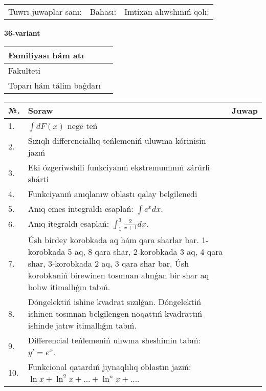 \documentclass{article}
\begin{document}
\vspace{1cm}

\begin{tabular}{ c c c }
Tuwrı juwaplar sanı: \underline{\hspace{2cm}} & Bahası: \underline{\hspace{2cm}} & Imtixan alıwshınıń qolı: \underline{\hspace{2cm}} \\
\end{tabular}

\newpage

\begin{center}\textbf{36-variant}\end{center}

\bgroup
\def\arraystretch{1.5}
\begin{tabular}{ |m{6cm}|m{10cm}| }
  \hline
  Familiyası hám atı & \\
  \hline
  Fakulteti &\\
  \hline
  Toparı hám tálim baǵdarı & \\
  \hline
\end{tabular}
\egroup

\vspace{0.5cm}

\bgroup
\def\arraystretch{2}
\begin{tabular}{ |l|m{8cm}|m{7cm}| }
  \hline
  №. & Soraw & Juwap \\
  \hline
  1. & $\displaystyle\int dF(x)$ nege teń &  \\
  \hline
  2. & Sızıqlı differenciallıq teńlemeniń uluwma kórinisin jazıń &  \\
  \hline
  3. & Eki ózgeriwshili funkciyanıń ekstremumınıń zárúrli shárti &  \\
  \hline
  4. & Funkciyanıń anıqlanıw oblastı qalay belgilenedi &  \\
  \hline
  5. & Anıq emes integraldı esaplań: $\displaystyle\int e^{x}dx$. &  \\
  \hline
  6. & Anıq itegraldı esaplań: $\displaystyle\int_{1}^{3}{\frac{2}{x + 1}dx}$. &  \\
  \hline
  7. & Úsh birdey korobkada aq hám qara sharlar bar. 1-korobkada 5 aq, 8 qara shar, 2-korobkada 3 aq, 4 qara shar, 3-korobkada 2 aq, 3 qara shar bar. Úsh korobkaniń birewinen tosınnan alınǵan bir shar aq bolıw itimallıǵın tabıń. &  \\
  \hline
  8. & Dóngelektiń ishine kvadrat sızılǵan. Dóngelektiń ishinen tosınnan belgilengen noqattıń kvadrattıń ishinde jatıw itimallıǵın tabıń. &  \\
  \hline
  9. & Differencial teńlemeniń ulıwma sheshimin tabıń: $y'=e^{x}$. &  \\
  \hline
  10. & Funkcional qatardıń jıynaqlılıq oblastın jazıń: $\ln x + \ln^{2}x + \ldots + \ln^{n}x + \ldots$. &  \\
  \hline
\end{tabular}
\egroup
\end{document}
